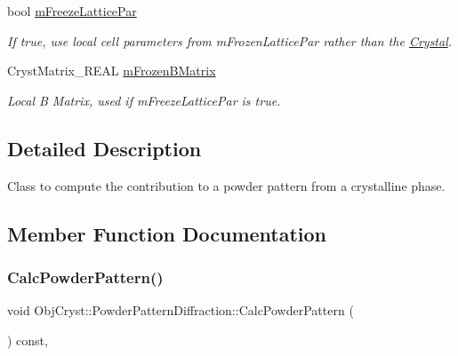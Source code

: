 \begin{DoxyCompactItemize}
bool \mbox{\hyperlink{class_obj_cryst_1_1_powder_pattern_diffraction_a2d75745c1614e132e3fdd98223c21972}{m\+Freeze\+Lattice\+Par}}
\begin{DoxyCompactList}\small\item\em If true, use local cell parameters from m\+Frozen\+Lattice\+Par rather than the \mbox{\hyperlink{class_obj_cryst_1_1_crystal}{Crystal}}. \end{DoxyCompactList}\item 
\mbox{\label{class_obj_cryst_1_1_powder_pattern_diffraction_aed44b5ff040d244dd923a70359056e2c}} 
Cryst\+Matrix\+\_\+\+R\+E\+AL \mbox{\hyperlink{class_obj_cryst_1_1_powder_pattern_diffraction_aed44b5ff040d244dd923a70359056e2c}{m\+Frozen\+B\+Matrix}}
\begin{DoxyCompactList}\small\item\em Local B Matrix, used if m\+Freeze\+Lattice\+Par is true. \end{DoxyCompactList}\end{DoxyCompactItemize}


\subsection{Detailed Description}
Class to compute the contribution to a powder pattern from a crystalline phase. 



\subsection{Member Function Documentation}
\mbox{\label{class_obj_cryst_1_1_powder_pattern_diffraction_a4c7d61b5c105ee235629a4dfdbdf9949}} 
\subsubsection{\texorpdfstring{CalcPowderPattern()}{CalcPowderPattern()}}
{\footnotesize\ttfamily void Obj\+Cryst\+::\+Powder\+Pattern\+Diffraction\+::\+Calc\+Powder\+Pattern (\begin{DoxyParamCaption}{ }\end{DoxyParamCaption}) const\hspace{0.3cm}{\ttfamily [protected]}, {\ttfamily [virtual]}}

